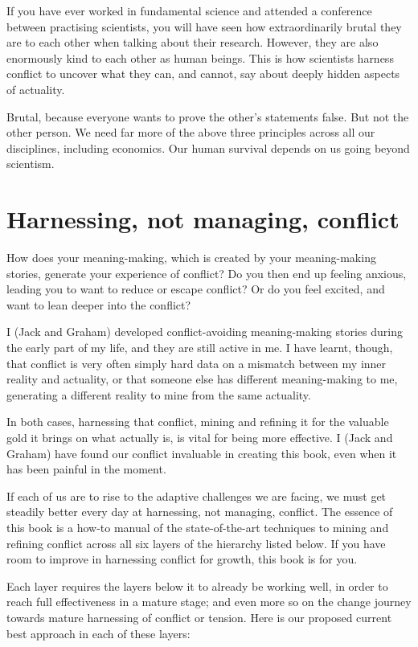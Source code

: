 If you have ever worked in fundamental science and attended a conference between practising scientists, you will have seen how extraordinarily brutal they are to each other when talking about their research. However, they are also enormously kind to each other as human beings. This is how scientists harness conflict to uncover what they can, and cannot, say about deeply hidden aspects of actuality.


Brutal, because everyone wants to prove the other's statements false. But not the other person. We need far more of the above three principles across all our disciplines, including economics. Our human survival depends on us going beyond scientism.
\section{Harnessing, not managing, conflict}
\label{section:harnessing-conflict-intro}
How does your meaning-making, which is created by your meaning-making stories, generate your experience of conflict? Do you then end up feeling anxious, leading you to want to reduce or escape conflict? Or do you feel excited, and want to lean deeper into the conflict?


I (Jack and Graham) developed conflict-avoiding meaning-making stories during the early part of my life, and they are still active in me. I have learnt, though, that conflict is very often simply hard data on a mismatch between my inner reality and actuality, or that someone else has different meaning-making to me, generating a different reality to mine from the same actuality. 


In both cases, harnessing that conflict, mining and refining it for the valuable gold it brings on what actually is, is vital for being more effective. I (Jack and Graham) have found our conflict invaluable in creating this book, even when it has been painful in the moment.


If each of us are to rise to the adaptive challenges we are facing, we must get steadily better every day at harnessing, not managing, conflict. The essence of this book is a how-to manual of the state-of-the-art techniques to mining and refining conflict across all six layers of the hierarchy listed below. If you have room to improve in harnessing conflict for growth, this book is for you.


Each layer requires the layers below it to already be working well, in order to reach full effectiveness in a mature stage; and even more so on the change journey towards mature harnessing of conflict or tension. Here is our proposed current best approach in each of these layers:


